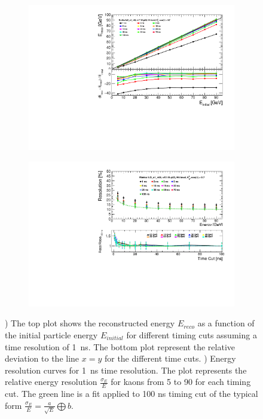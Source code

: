 \begin{figure}[htbp!]
  \centering
  \begin{subfigure}[t]{0.49\textwidth}
    \centering
    \includegraphics[width=1\linewidth]{../Thesis_Plots/ILD/Smearing_1ns/Plots/Linearity_TimeCuts_Smearing2}
    \caption{} \label{fig:Lin1ns}
  \end{subfigure}
  \hfill
  \begin{subfigure}[t]{0.49\textwidth}
    \centering
    \includegraphics[width=1\linewidth]{../Thesis_Plots/ILD/Smearing_1ns/Plots/ShowerResoAbsolute_TimeCuts_Smearing2}
    \caption{} \label{fig:Reso1ns}
  \end{subfigure}
  \caption{) The top plot shows the reconstructed energy $E_{reco}$ as a function of the initial particle energy $E_{initial}$ for different timing cuts assuming a time resolution of \SI{1}{\nano\second}. The bottom plot represent the relative deviation to the line $x=y$ for the different time cuts. ) Energy resolution curves for \SI{1}{\nano\second} time resolution. The plot represents the relative energy resolution $\frac{\sigma_{E}}{E}$ for kaons from 5 to 90 \GeV for each timing cut. The green line is a fit applied to 100 ns timing cut of the typical form $\frac{\sigma_{E}}{E} = \frac{a}{\sqrt{E}} \bigoplus b$.}
\end{figure}

